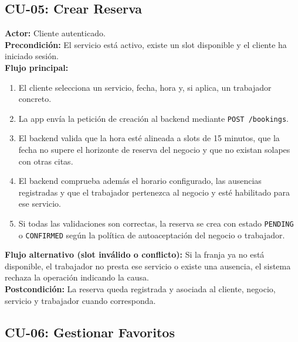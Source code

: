 \documentclass[12pt,a4paper,twoside]{report}
\begin{document}
\subsection{CU-05: Crear Reserva}

\begin{tcolorbox}[definicionStyle, title={CU-05 — Crear Reserva}]
\textbf{Actor:} Cliente autenticado. \\
\textbf{Precondición:} El servicio está activo, existe un slot disponible y el cliente ha iniciado sesión. \\
\textbf{Flujo principal:}
\begin{enumerate}
  \item El cliente selecciona un servicio, fecha, hora y, si aplica, un trabajador concreto.
  \item La app envía la petición de creación al backend mediante \texttt{POST /bookings}.
  \item El backend valida que la hora esté alineada a slots de 15 minutos, que la fecha no supere el horizonte de reserva del negocio y que no existan solapes con otras citas.
  \item El backend comprueba además el horario configurado, las ausencias registradas y que el trabajador pertenezca al negocio y esté habilitado para ese servicio.
  \item Si todas las validaciones son correctas, la reserva se crea con estado \texttt{PENDING} o \texttt{CONFIRMED} según la política de autoaceptación del negocio o trabajador.
\end{enumerate}
\textbf{Flujo alternativo (slot inválido o conflicto):} Si la franja ya no está disponible, el trabajador no presta ese servicio o existe una ausencia, el sistema rechaza la operación indicando la causa. \\
\textbf{Postcondición:} La reserva queda registrada y asociada al cliente, negocio, servicio y trabajador cuando corresponda.
\end{tcolorbox}

\subsection{CU-06: Gestionar Favoritos}
\end{document}
